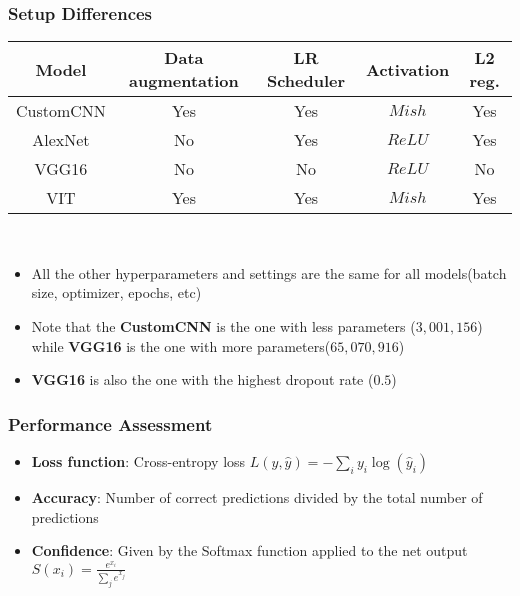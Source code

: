 \documentclass[../presentation.tex]{subfiles} %
\begin{document}
\begin{frame}
    \frametitle{Setup Differences}
    \hspace*{-0.7cm}
    \begin{tabular}{|c|c|c|c|c|}
        \hline
        \textbf{Model} & \textbf{Data augmentation} &\textbf{LR Scheduler} & \textbf{Activation} & \textbf{L2 reg.} \\
        \hline
        CustomCNN & Yes & Yes & $Mish$ & Yes \\
        AlexNet & No & Yes & $ReLU$ & Yes \\
        VGG16 & No & No & $ReLU$ & No \\
        VIT & Yes & Yes & $Mish$ & Yes \\
        \hline
    \end{tabular}\\
    \vspace{0.5cm}
    \begin{cbox}
        \begin{itemize}
            \item All the other hyperparameters and settings are the same for all models(batch size, optimizer, epochs, etc)
            \item Note that the \textbf{CustomCNN} is the one with less parameters ($3,001,156$) while \textbf{VGG16} is the one with more parameters($65,070,916$)
            \item \textbf{VGG16} is also the one with the highest dropout rate ($0.5$)
        \end{itemize}
    \end{cbox}
\end{frame}

\begin{frame}
    \frametitle{Performance Assessment}
    \begin{itemize}
        \item \textbf{Loss function}: Cross-entropy loss $L(y, \hat{y}) = -\sum_{i} y_i \log(\hat{y}_i)$
        \item \textbf{Accuracy}: Number of correct predictions divided by the total number of predictions
        \item \textbf{Confidence}: Given by the Softmax function applied to the net output $S(x_i) = \frac{e^{x_i}}{\sum_{j} e^{x_j}}$
    \end{itemize}

\end{frame}
\end{document}
